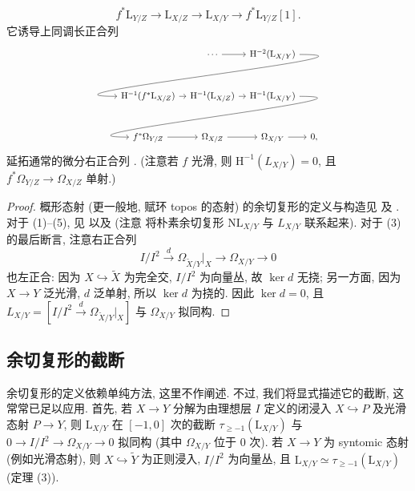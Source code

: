 \begin{theorem}
\begin{enumerate}[(1)]
\[
f^*\mathrm L_{Y/Z}\to\mathrm L_{X/Z}\to\mathrm L_{X/Y}\to f^*\mathrm L_{Y/Z}[1].
\]
它诱导上同调长正合列
\begingroup\footnotesize
\[
\begin{tikzcd}[column sep=8pt,row sep=large]
&\cdots\arrow[r]&\mathrm H^{-2}(\mathrm L_{X/Y})\arrow[dll,out=0,in=180,looseness=1.5]&\\
\mathrm H^{-1}(f^*\mathrm L_{X/Z})\arrow[r]&\mathrm H^{-1}(\mathrm L_{X/Z})\arrow[r]&\mathrm H^{-1}(\mathrm L_{X/Y})\arrow[dll,out=0,in=180,looseness=1.5]&\\
f^*\Omega_{Y/Z}\arrow[r]&\Omega_{X/Z}\arrow[r]&\Omega_{X/Y}\arrow[r]&0,
\end{tikzcd}
\]
\endgroup
延拓通常的微分右正合列 \cite[II.$8.12$]{Har77}. (注意若 $f$ 光滑, 则 $\mathrm H^{-1}(L_{X/Y})=0$, 且 $f^*\Omega_{Y/Z}\to\Omega_{X/Z}$ 单射.)
\end{enumerate}
\end{theorem}
\begin{proof}
概形态射 (更一般地, 赋环 topos 的态射) 的余切复形的定义与构造见 \cite[II.$1.2.3$]{Ill71} 及 \cite[Tag 08T2]{SP}. 对于 (1)--(5), 见 \cite[II.$1.2.4.2$, II.$3.1.2$, II.$3.2.6$, II.$2.2.3$ 及 II.$2.1.2$]{Ill71} 以及 \cite[Tags 08UV, 0D0N, 0FK3, 08QQ 及 08T4]{SP} (注意 \cite[Tag 08RB]{SP} 将朴素余切复形 $\mathrm{NL}_{X/Y}$ 与 $L_{X/Y}$ 联系起来). 对于 (3) 的最后断言, 注意右正合列
\begin{equation}\label{src:C.3.2}
I/I^2\xrightarrow{d}\Omega_{\widetilde X/Y}|_X\longrightarrow\Omega_{X/Y}\longrightarrow0
\end{equation}
也左正合: 因为 $X\hookrightarrow\widetilde X$ 为完全交, $I/I^2$ 为向量丛, 故 $\ker d$ 无挠; 另一方面, 因为 $X\to Y$ 泛光滑, $d$ 泛单射, 所以 $\ker d$ 为挠的. 因此 $\ker d=0$, 且 $L_{X/Y}=[I/I^2\xrightarrow{d}\Omega_{\widetilde X/Y}|_X]$ 与 $\Omega_{X/Y}$ 拟同构.
\end{proof}
\subsection{余切复形的截断}\label{src:C.3.2-subsection}
余切复形的定义依赖单纯方法, 这里不作阐述. 不过, 我们将显式描述它的截断, 这常常已足以应用. 首先, 若 $X\to Y$ 分解为由理想层 $I$ 定义的闭浸入 $X\hookrightarrow P$ 及光滑态射 $P\to Y$, 则 $\mathrm L_{X/Y}$ 在 $[-1,0]$ 次的截断 $\tau_{\geq-1}(\mathrm L_{X/Y})$ 与 $0\to I/I^2\to\Omega_{X/Y}\to0$ 拟同构 (其中 $\Omega_{X/Y}$ 位于 $0$ 次). 若 $X\to Y$ 为 syntomic 态射 (例如光滑态射), 则 $X\hookrightarrow\widetilde Y$ 为正则浸入, $I/I^2$ 为向量丛, 且 $\mathrm L_{X/Y}\simeq\tau_{\geq-1}(\mathrm L_{X/Y})$ (定理 (3)).

